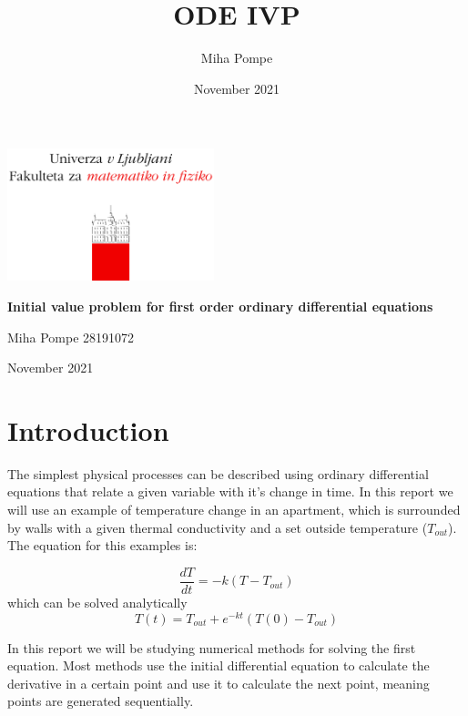 \documentclass[12pt, a4paper]{article}
\title{ODE IVP}
\author{Miha Pompe}
\date{November 2021}
\begin{document}
\begin{titlepage}
	\centering
 	\includegraphics[width=0.45\textwidth]{logo_fmf_uni-lj_sl_veliki.png}\par\vspace{1cm}

	\vspace{1cm}

	\vspace{1.5cm}
	{\huge\bfseries Initial value problem for first order ordinary differential equations\par}
	\vspace{2cm}
	{\Large Miha Pompe 28191072\par}
	\vfill

	\vfill

	{\large November 2021\par}
\end{titlepage}
\thispagestyle{empty}
\clearpage
{}
\newpage


\section{Introduction}
The simplest physical processes can be described using ordinary differential equations that relate a given variable with it's change in time. In this report we will use an example of temperature change in an apartment, which is surrounded by walls with a given thermal conductivity and a set outside temperature ($T_{out}$). The equation for this examples is:

\begin{equation}
  \frac{dT}{dt} = -k(T - T_{out})
\end{equation}
which can be solved analytically
\begin{equation}
  T(t) = T_{out} + e^{-kt}(T(0) - T_{out})
\end{equation}

In this report we will be studying numerical methods for solving the first equation. Most methods use the initial differential equation to calculate the derivative in a certain point and use it to calculate the next point, meaning points are generated sequentially.
\end{document}
